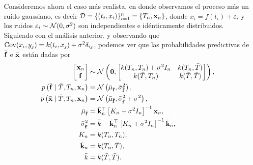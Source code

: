 Consideremos ahora el caso más realista, en donde observamos el proceso más un ruido gaussiano, es decir \(\mathcal{D} = \{(t_i,x_i)\}_{i=1}^n = \{T_n, \mathbf{x}_n\}\), donde \(x_i = f(t_i) + \varepsilon_i\) y los ruidos \(\varepsilon_i \sim \mathcal{N}(0, \sigma^2)\) son independientes e idénticamente distribuidos. Siguiendo con el análisis anterior, y observando que \(\operatorname{Cov}(x_i, y_j) = k(t_i, x_j) + \sigma^2 \delta_{ij}\), podemos ver que las probabilidades predictivas de \(\bar{\mathbf{f}}\) e \(\bar{\mathbf{x}}\) están dadas por
\begin{align*}
	\begin{bmatrix}
		\mathbf{x}_n \\
		\bar{\mathbf{f}}
	\end{bmatrix}
	&\sim \mathcal{N} \left(\mathbf{0},
	\begin{bmatrix}
		k(T_n, T_n) + \sigma^2 I_n	& k(T_n, \bar{T})\\
		k(\bar{T}, T_n)				& k(\bar{T}, \bar{T})
	\end{bmatrix}
	\right), \\
	p\left(\bar{\mathbf{f}} \mid \bar{T}, T_n, \mathbf{x}_n\right)	&= \mathcal{N}\left(\bar{\mu}_{\bar{\mathbf{f}}}, \bar{\sigma}_{\bar{\mathbf{f}}}^2\right),\\
	p\left(\bar{\mathbf{x}} \mid \bar{T}, T_n, \mathbf{x}_n\right)	&= \mathcal{N}\left(\bar{\mu}_{\bar{\mathbf{f}}}, \bar{\sigma}_{\bar{\mathbf{f}}}^2 + \sigma^2\right),\\
	\bar{\mu}_{\bar{\mathbf{f}}}								&= \bar{\mathbf{k}}_{n}^{\top} \left[K_{n} + \sigma^2 I_n\right]^{-1}\mathbf{x}_n,\\
	\bar{\sigma}_{\bar{\mathbf{f}}}^2							&= \bar{k}-\bar{\mathbf{k}}_{n}^{\top} \left[K_{n} + \sigma^2 I_n\right]^{-1} \bar{\mathbf{k}}_{n},\\
	K_{n}												&= k(T_n, T_n),\\
	\bar{\mathbf{k}}_{n}										&= k(T_n, \bar{T}),\\
	\bar{k}												&= k(\bar{T}, \bar{T}).
\end{align*}

